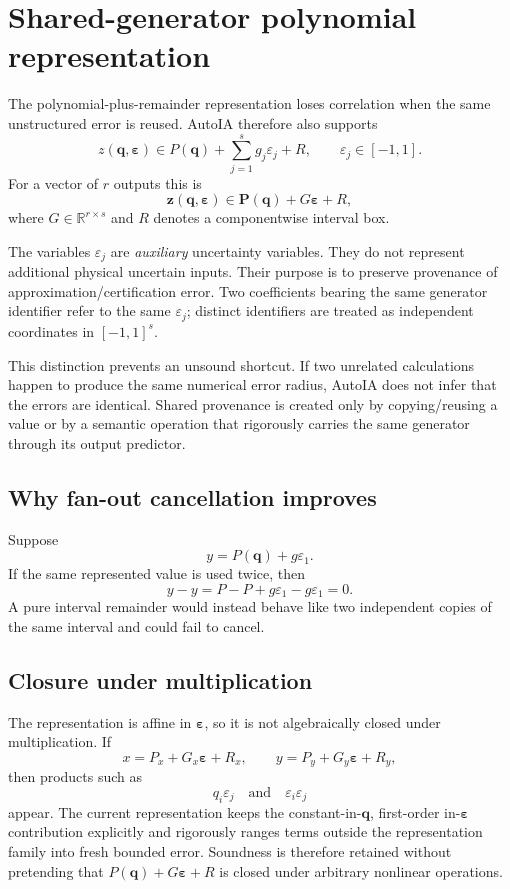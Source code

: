 \documentclass[11pt]{article}
\newcommand{\R}{\mathbb{R}}
\newcommand{\eps}{\varepsilon}
\newcommand{\epsv}{\boldsymbol{\varepsilon}}
\newcommand{\qv}{\mathbf{q}}
\begin{document}
\section{Shared-generator polynomial representation}

The polynomial-plus-remainder representation loses correlation when the same
unstructured error is reused.  AutoIA therefore also supports
\[
  \boxed{
  z(\qv,\epsv)
  \in
  P(\qv)+\sum_{j=1}^s g_j\eps_j+R,
  \qquad \eps_j\in[-1,1].
  }
\]
For a vector of \(r\) outputs this is
\[
  \boxed{
  \mathbf{z}(\qv,\epsv)
  \in
  \mathbf{P}(\qv)+G\epsv+R,
  }
\]
where \(G\in\R^{r\times s}\) and \(R\) denotes a componentwise interval box.

The variables \(\eps_j\) are \emph{auxiliary} uncertainty variables.  They do not
represent additional physical uncertain inputs.  Their purpose is to preserve
provenance of approximation/certification error.  Two coefficients bearing the
same generator identifier refer to the same \(\eps_j\); distinct identifiers are
treated as independent coordinates in \([-1,1]^s\).

This distinction prevents an unsound shortcut.  If two unrelated calculations
happen to produce the same numerical error radius, AutoIA does not infer that
the errors are identical.  Shared provenance is created only by copying/reusing
a value or by a semantic operation that rigorously carries the same generator
through its output predictor.

\subsection{Why fan-out cancellation improves}

Suppose
\[
  y=P(\qv)+g\eps_1.
\]
If the same represented value is used twice, then
\[
  y-y
  =P-P+g\eps_1-g\eps_1
  =0.
\]
A pure interval remainder would instead behave like two independent copies of
the same interval and could fail to cancel.

\subsection{Closure under multiplication}

The representation is affine in \(\epsv\), so it is not algebraically closed
under multiplication.  If
\[
  x=P_x+G_x\epsv+R_x,
  \qquad
  y=P_y+G_y\epsv+R_y,
\]
then products such as
\[
  q_i\eps_j
  \quad\text{and}\quad
  \eps_i\eps_j
\]
appear.  The current representation keeps the constant-in-\(\qv\), first-order
in-\(\epsv\) contribution explicitly and rigorously ranges terms outside the
representation family into fresh bounded error.  Soundness is therefore retained
without pretending that \(P(\qv)+G\epsv+R\) is closed under arbitrary nonlinear
operations.
\end{document}
